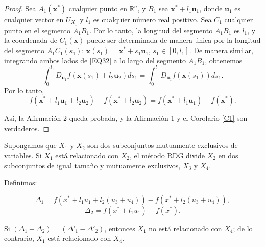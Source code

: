 \begin{proof}
Sea \( A_1 (\mathbf{x}^*) \) cualquier punto en \( \mathbb{R}^n \), y \( B_1 \) sea \( \mathbf{x}^* + l_1 \mathbf{u}_1 \), donde \( \mathbf{u}_1 \) es cualquier vector en \( U_{X_1} \) y \( l_1 \) es cualquier número real positivo. Sea \( C_1 \) cualquier punto en el segmento \( A_1 B_1 \). Por lo tanto, la longitud del segmento \( A_1 B_1 \) es \( l_1 \), y la coordenada de \( C_1 (\mathbf{x}) \) puede ser determinada de manera única por la longitud del segmento \( A_1 C_1 (s_1) \): \( \mathbf{x}(s_1) = \mathbf{x}^* + s_1 \mathbf{u}_1 \), \( s_1 \in [0, l_1] \). De manera similar, integrando ambos lados de \eqref{EQ32} a lo largo del segmento \( A_1 B_1 \), obtenemos
\begin{equation}
\int_0^{l_1} D_{\mathbf{u}_1} f(\mathbf{x}(s_1) + l_2 \mathbf{u}_2) ds_1 = \int_0^{l_1} D_{\mathbf{u}_1} f(\mathbf{x}(s_1)) ds_1.
\label{EQ33}
\end{equation}
Por lo tanto,
\begin{equation}
f(\mathbf{x}^* + l_1 \mathbf{u}_1 + l_2 \mathbf{u}_2) - f(\mathbf{x}^* + l_2 \mathbf{u}_2) = f(\mathbf{x}^* + l_1 \mathbf{u}_1) - f(\mathbf{x}^*).
\label{EQ34}
\end{equation}

Así, la Afirmación 2 queda probada, y la Afirmación 1 y el Corolario \ref{C1} son verdaderos.
\end{proof}

Supongamos que \( X_1 \) y \( X_2 \) son dos subconjuntos mutuamente exclusivos de variables. Si \( X_1 \) está relacionado con \( X_2 \), el método RDG divide \( X_2 \) en dos subconjuntos de igual tamaño y mutuamente exclusivos, \( X_3 \) y \( X_4 \).

Definimos:

\begin{equation}
\Delta_1 = f(x^* + l_1 u_1 + l_2(u_3 + u_4)) - f(x^* + l_2(u_3 + u_4)),
\label{EQ35}
\end{equation}
\begin{equation}
\Delta_2 = f(x^* + l_1 u_1) - f(x^*).
\label{EQ36}
\end{equation}

\begin{proposicion} 
\label{P2}
Si \( (\Delta_1 - \Delta_2) = (\Delta'_1 - \Delta'_2) \), entonces \( X_1 \) no está relacionado con \( X_4 \); de lo contrario, \( X_1 \) está relacionado con \( X_4 \).
\end{proposicion}

